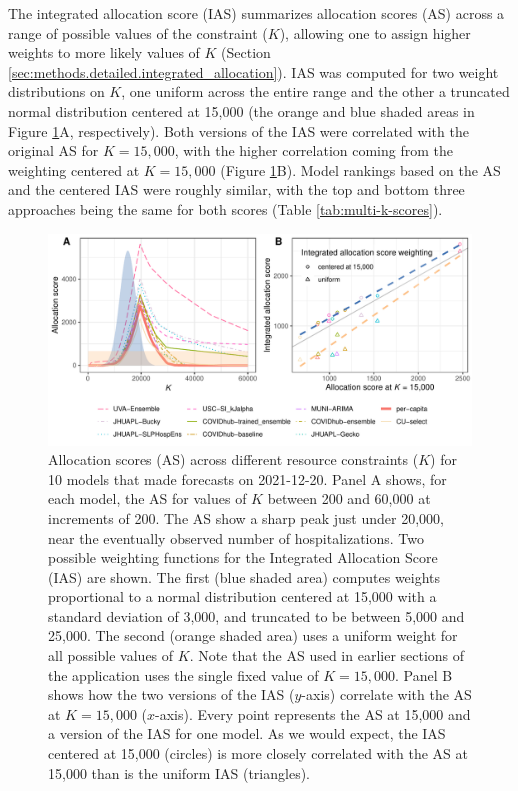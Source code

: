 \documentclass{article}\usepackage[]{graphicx}\usepackage[]{xcolor}
\makeatletter
\def\maxwidth{ %
  \ifdim\Gin@nat@width>\linewidth
    \linewidth
  \else
    \Gin@nat@width
  \fi
}
\newenvironment{knitrout}{}{} %
\makeatother
\begin{document}
The integrated allocation score (IAS) summarizes allocation scores (AS) across a range of possible values of the
constraint ($K$), allowing one to assign higher weights to more likely values of $K$ (Section
\ref{sec:methods.detailed.integrated_allocation}). IAS was computed for two weight distributions on $K$, one uniform
across the entire range and the other a truncated normal distribution centered at 15,000 (the orange and blue shaded areas in Figure
\ref{fig:multi-k}A, respectively). Both versions of the IAS were correlated with the original AS for $K=15,000$, with
the higher correlation coming from the weighting centered at $K=15,000$ (Figure \ref{fig:multi-k}B). Model rankings
based on the AS and the centered IAS were roughly similar, with the top and bottom three approaches being the same for
both scores (Table \ref{tab:multi-k-scores}).

\begin{knitrout}
\color{fgcolor}\begin{figure}[H]
\includegraphics[width=\maxwidth]{figure/multi-k-1} \caption[Allocation scores (AS) across different resource constraints ($K$) for 10 models that made forecasts on 2021-12-20]{Allocation scores (AS) across different resource constraints ($K$) for 10 models that made forecasts on 2021-12-20. Panel A shows, for each model, the AS for values of $K$ between 200 and 60,000 at increments of 200. The AS show a sharp peak just under 20,000, near the eventually observed number of hospitalizations. Two possible weighting functions for the Integrated Allocation Score (IAS) are shown. The first (blue shaded area) computes weights proportional to a normal distribution centered at 15,000 with a standard deviation of 3,000, and truncated to be between 5,000 and 25,000. The second (orange shaded area) uses a uniform weight for all possible values of $K$. Note that the AS used in earlier sections of the application uses the single fixed value of $K=15,000$.  Panel B shows how the two versions of the IAS ($y$-axis) correlate with the AS at $K=15,000$ ($x$-axis). Every point represents the AS at 15,000 and a version of the IAS for one model. As we would expect, the IAS centered at 15,000 (circles) is more closely correlated with the AS at 15,000 than is the uniform IAS (triangles).}\label{fig:multi-k}
\end{figure}

\end{knitrout}
\end{document}
